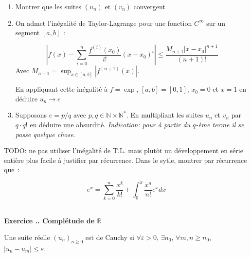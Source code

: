 \documentclass{article}
\newcommand{\mb}[1]{\mathbb{#1}}
\newcounter{exo}
\newcommand{\exercice}[1][\null]{\textbf{\\ Exercice \thesection.\theexo. #1} \addtocounter{exo}{1}}
\begin{document}
\begin{enumerate}
    \item Montrer que les suites $(u_n)$ et $(v_n)$ convergent 
    \item On admet l'inégalité de Taylor-Lagrange pour une 
        fonction $C^\infty$ sur un segment $[a,b]$~:

        \begin{equation*}
            \left|
            f(x) - \sum_{i = 0}^{n} \frac{f^{(i)} (x_0)}{i!} (x - x_0)^i 
            \right|
            \leq 
            \frac{M_{n+1} |x - x_0|^{n+1}}{(n+1)!}
        \end{equation*}
        Avec $M_{n+1} = \sup_{x \in [a,b] } |f^{(n+1)} (x)|$.

        En appliquant cette inégalité à $f = \exp$, $[a,b] = [0,1]$,
        $x_0 = 0$ et $x = 1$ 
        en déduire $u_n \to e$

    \item Supposons $e = p/q$ avec $p,q \in \mathbb{N} \times \mathbb{N}^*$.
        En multipliant les suites $u_n$ et $v_n$ par $q \cdot q!$ en déduire 
        une absurdité. \emph{Indication: pour à partir du $q$-ème terme il se
        passe quelque chose}.
\end{enumerate}

TODO: ne pas utiliser l'inégalité de T.L. mais plutôt 
un développement en série entière plus facile à justifier par récurrence. 
Dans le sytle, montrer par récurrence que~:

\begin{equation*}
    e^x = \sum_{k = 0}^n \frac{x^k}{k!} + \int_0^x \frac{x^n}{n!} e^x dx
\end{equation*}








\exercice[Complétude de $\mb{R}$]

Une suite réelle $(u_n)_{n \ge 0}$ est de Cauchy si $\forall \varepsilon >0$, $\exists n_0$, $\forall m,n \ge n_0$, $|u_n - u_m | \le \varepsilon$.
\end{document}
